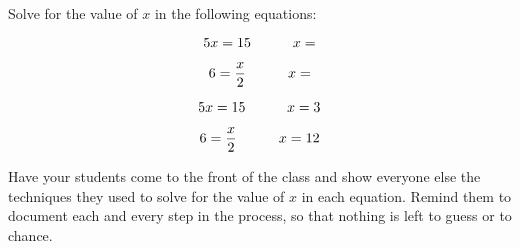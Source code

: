 

Solve for the value of $x$ in the following equations:

$$5x = 15 \hbox{\hskip 30pt} x = $$

\vskip 10pt

$$6 = {x \over 2} \hbox{\hskip 30pt} x = $$







$$5x = 15 \hbox{\hskip 30pt} x = 3$$

$$6 = {x \over 2} \hbox{\hskip 30pt} x = 12$$







Have your students come to the front of the class and show everyone else the techniques they used to solve for the value of $x$ in each equation.  Remind them to document each and every step in the process, so that nothing is left to guess or to chance.




